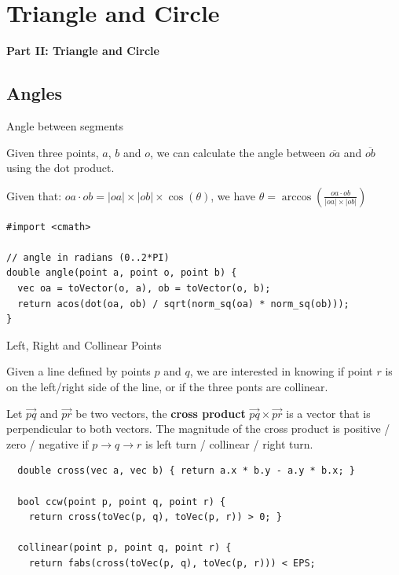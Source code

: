\section{Triangle and Circle}

\begin{frame}{}
  \begin{center}
    {\bf Part II: Triangle and Circle}
  \end{center}
\end{frame}

\subsection{Angles}
\begin{frame}[fragile]{Angle between segments}

Given three points, $a$, $b$ and $o$, we can calculate
the angle between $\overline{oa}$ and $\overline{ob}$ using the dot product.\medskip

Given that: $oa\cdot ob = |oa|\times|ob|\times\cos(\theta)$, we have $\theta = \arccos(\frac{oa\cdot ob}{|oa|\times|ob|})$\bigskip

{\smaller

\begin{exampleblock}{}
\begin{verbatim}
#import <cmath>

// angle in radians (0..2*PI)
double angle(point a, point o, point b) {
  vec oa = toVector(o, a), ob = toVector(o, b);
  return acos(dot(oa, ob) / sqrt(norm_sq(oa) * norm_sq(ob)));
}
\end{verbatim}
\end{exampleblock}}
\end{frame}

\begin{frame}[fragile]{Left, Right and Collinear Points}

  Given a line defined by points $p$ and $q$, we are interested in knowing if point $r$ is on the left/right side of the line, or if the three ponts are collinear.\bigskip

  Let $\vec{pq}$ and $\vec{pr}$ be two vectors, the {\bf cross product} $\vec{pq} \times \vec{pr}$ is a vector that is perpendicular to both vectors. The  magnitude of the cross product is positive / zero / negative if $p \to q \to r$ is left turn / collinear / right turn.

  {\smaller
  \begin{exampleblock}{}
  \begin{verbatim}
  double cross(vec a, vec b) { return a.x * b.y - a.y * b.x; }

  bool ccw(point p, point q, point r) {
    return cross(toVec(p, q), toVec(p, r)) > 0; }

  collinear(point p, point q, point r) {
    return fabs(cross(toVec(p, q), toVec(p, r))) < EPS;
  \end{verbatim}
  \end{exampleblock}
  }
\end{frame}


